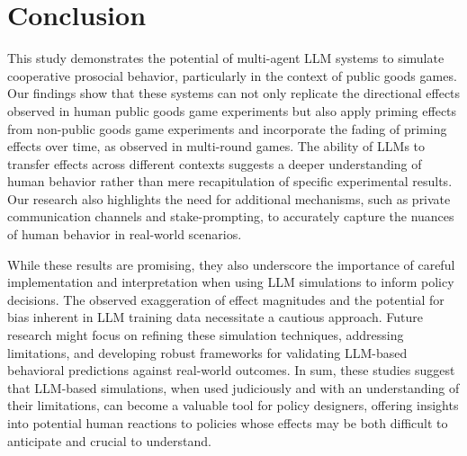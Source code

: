 \section{Conclusion}

This study demonstrates the potential of multi-agent LLM systems to simulate cooperative prosocial behavior, particularly in the context of public goods games. Our findings show that these systems can not only replicate the directional effects observed in human public goods game experiments but also apply priming effects from non-public goods game experiments and incorporate the fading of priming effects over time, as observed in multi-round games. The ability of LLMs to transfer effects across different contexts suggests a deeper understanding of human behavior rather than mere recapitulation of specific experimental results. Our research also highlights the need for additional mechanisms, such as private communication channels and stake-prompting, to accurately capture the nuances of human behavior in real-world scenarios.

While these results are promising, they also underscore the importance of careful implementation and interpretation when using LLM simulations to inform policy decisions. The observed exaggeration of effect magnitudes and the potential for bias inherent in LLM training data necessitate a cautious approach. Future research might focus on refining these simulation techniques, addressing limitations, and developing robust frameworks for validating LLM-based behavioral predictions against real-world outcomes. In sum, these studies suggest that LLM-based simulations, when used judiciously and with an understanding of their limitations, can become a valuable tool for policy designers, offering insights into potential human reactions to policies whose effects may be both difficult to anticipate and crucial to understand.
